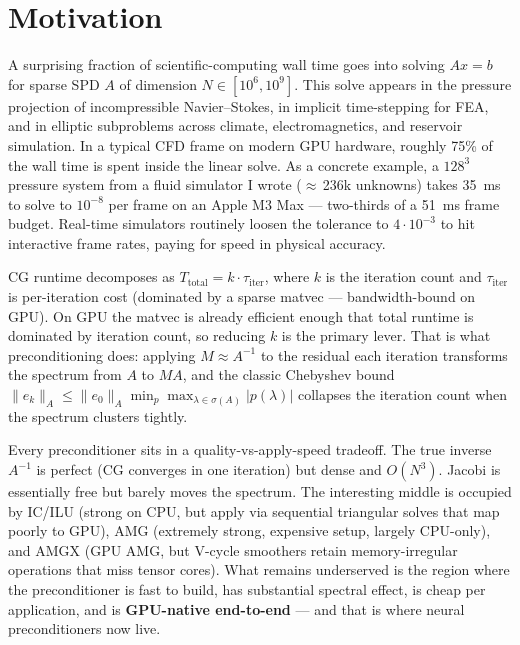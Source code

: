 \documentclass[11pt]{article}
\begin{document}
\section{Motivation}

A surprising fraction of scientific-computing wall time goes into solving $Ax=b$ for sparse SPD $A$ of dimension $N \in [10^6, 10^9]$. This solve appears in the pressure projection of incompressible Navier--Stokes, in implicit time-stepping for FEA, and in elliptic subproblems across climate, electromagnetics, and reservoir simulation. In a typical CFD frame on modern GPU hardware, roughly 75\% of the wall time is spent inside the linear solve. As a concrete example, a $128^3$ pressure system from a fluid simulator I wrote ($\approx$\,236k unknowns) takes 35~ms to solve to $10^{-8}$ per frame on an Apple M3 Max --- two-thirds of a 51~ms frame budget. Real-time simulators routinely loosen the tolerance to $4\cdot10^{-3}$ to hit interactive frame rates, paying for speed in physical accuracy.

CG runtime decomposes as $T_{\text{total}} = k \cdot \tau_{\text{iter}}$, where $k$ is the iteration count and $\tau_{\text{iter}}$ is per-iteration cost (dominated by a sparse matvec --- bandwidth-bound on GPU). On GPU the matvec is already efficient enough that total runtime is dominated by iteration count, so reducing $k$ is the primary lever. That is what preconditioning does: applying $M \approx A^{-1}$ to the residual each iteration transforms the spectrum from $A$ to $MA$, and the classic Chebyshev bound $\|e_k\|_A \le \|e_0\|_A \min_p \max_{\lambda \in \sigma(A)} |p(\lambda)|$ collapses the iteration count when the spectrum clusters tightly.

Every preconditioner sits in a quality-vs-apply-speed tradeoff. The true inverse $A^{-1}$ is perfect (CG converges in one iteration) but dense and $O(N^3)$. Jacobi is essentially free but barely moves the spectrum. The interesting middle is occupied by IC/ILU (strong on CPU, but apply via sequential triangular solves that map poorly to GPU), AMG (extremely strong, expensive setup, largely CPU-only), and AMGX (GPU AMG, but V-cycle smoothers retain memory-irregular operations that miss tensor cores). What remains underserved is the region where the preconditioner is fast to build, has substantial spectral effect, is cheap per application, and is \textbf{GPU-native end-to-end} --- and that is where neural preconditioners now live.
\end{document}
